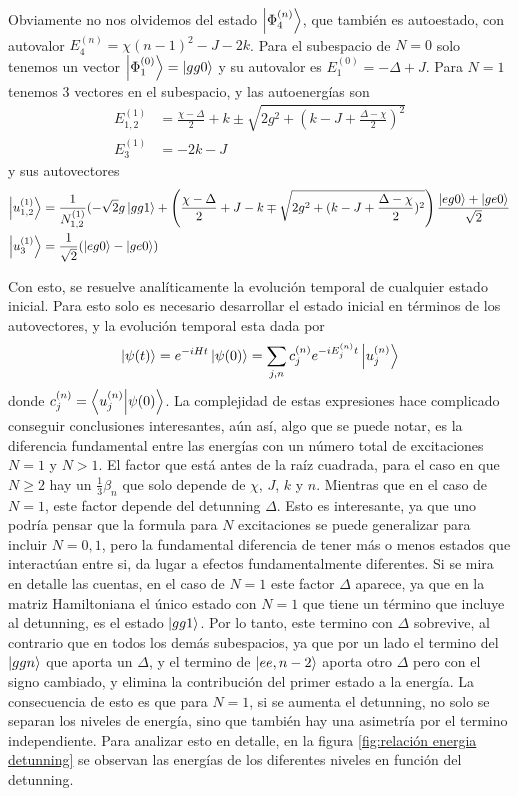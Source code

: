 Obviamente no nos olvidemos del estado $\ket{\Phi_4^{(n)}}$, que tambi\'en es autoestado, con autovalor $E_4^{(n)}=\chi(n-1)^2-J-2k$.
Para el subespacio de $N=0$ solo tenemos un vector $\ket{\Phi_1^{(0)}}=\ket{gg0}$ y su autovalor es $E_1^{(0)}=-\Delta+J$.
Para $N=1$ tenemos 3 vectores en el subespacio, y las autoenergías son
\begin{align}\label{ec4:energias n1}
    E_{1,2}^{(1)} &=\frac{\chi -\Delta}{2} +k \pm \sqrt{2g^2+(k-J+\frac{\Delta -\chi}{2} )^2}\\
    E_3^{(1)} & = -2k-J      
\end{align}
y sus autovectores
\begin{equation}
    \begin{aligned}
        \ket{u_{1,2}^{(1)}}&=\frac{1}{N_{1,2}^{(1)}}(-\sqrt{2}g\ket{gg1}+ \left(\frac{\chi-\Delta}{2}+J-k \mp \sqrt{2g^2+(k-J+\frac{\Delta -\chi}{2} )^2} \right)\dfrac{\ket{eg0}+\ket{ge0}}{\sqrt{2}}\\
        \ket{u_3^{(1)}}&= \frac{1}{\sqrt{2}}(\ket{eg0}-\ket{ge0})
    \end{aligned}
\end{equation}

Con esto, se resuelve analíticamente la evolución temporal de cualquier estado inicial.
Para esto solo es necesario desarrollar el estado inicial en términos de los autovectores, y la evolución temporal esta dada por
\begin{equation}
\ket{\psi(t)}=e^{-iHt}\ket{\psi(0)}=\sum_{j,n} c_j^{(n)}e^{-iE_j^{(n)}t}\ket{u_j^{(n)}}
\end{equation}
donde $c_j^{(n)}=\braket{u_j^{(n)}}{\psi(0)}$.
La complejidad de estas expresiones hace complicado conseguir conclusiones interesantes, aún así, algo que se puede notar, es la diferencia fundamental entre las energías con un número total de excitaciones $N=1$ y $N>1$. El factor que está antes de la raíz cuadrada, para el caso en que $N \geq 2$ hay un $\frac{1}{3}\beta_n$ que solo depende de $\chi$, $J$, $k$ y $n$. Mientras que en el caso de $N=1$, este factor depende del detunning $\Delta$. Esto es interesante, ya que uno podría pensar que la formula para $N$ excitaciones se puede generalizar para incluir $N=0,1$, pero la fundamental diferencia de tener más o menos estados que interactúan entre si, da lugar a efectos fundamentalmente diferentes. Si se mira en detalle las cuentas, en el caso de $N=1$ este factor $\Delta$ aparece, ya que en la matriz Hamiltoniana el único estado con $N=1$ que tiene un término que incluye al detunning, es el estado $\ket{gg1}$. Por lo tanto, este termino con $\Delta$ sobrevive, al contrario que en todos los demás subespacios, ya que por un lado el termino del $\ket{ggn}$ que aporta un $\Delta$, y el termino de $\ket{ee,n-2}$ aporta otro $\Delta$ pero con el signo cambiado, y elimina la contribución del primer estado a la energía. La consecuencia de esto es que para $N=1$, si se aumenta el detunning, no solo se separan los niveles de energía, sino que también hay una asimetría por el termino independiente. Para analizar esto en detalle, en la figura \ref{fig:relación energia detunning} se observan las energías de los diferentes niveles en función del detunning. 

